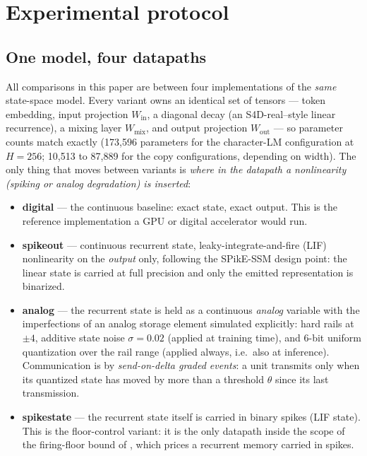 
\section{Experimental protocol}
\label{sec:protocol}

\subsection{One model, four datapaths}
\label{sec:variants}

All comparisons in this paper are between four implementations of the \emph{same} state-space
model. Every variant owns an identical set of tensors --- token embedding, input projection
$W_{\mathrm{in}}$, a diagonal decay (an S4D-real--style linear recurrence), a mixing layer
$W_{\mathrm{mix}}$, and output projection $W_{\mathrm{out}}$ --- so parameter counts match
exactly (173{,}596 parameters for the character-LM configuration at $H{=}256$; 10{,}513 to
87{,}889 for the copy configurations, depending on width). The only thing that moves between
variants is \emph{where in the datapath a nonlinearity (spiking or analog degradation) is
inserted}:

\begin{itemize}
  \item \textbf{digital} --- the continuous baseline: exact state, exact output. This is the
    reference implementation a GPU or digital accelerator would run.
  \item \textbf{spikeout} --- continuous recurrent state, leaky-integrate-and-fire (LIF)
    nonlinearity on the \emph{output} only, following the SPikE-SSM design point: the linear
    state is carried at full precision and only the emitted representation is binarized.
  \item \textbf{analog} --- the recurrent state is held as a continuous \emph{analog} variable
    with the imperfections of an analog storage element simulated explicitly: hard rails at
    $\pm 4$, additive state noise $\sigma{=}0.02$ (applied at training time), and 6-bit uniform
    quantization over the rail range (applied always, i.e.\ also at inference). Communication
    is by \emph{send-on-delta graded events}: a unit transmits only when its quantized state
    has moved by more than a threshold $\theta$ since its last transmission.
  \item \textbf{spikestate} --- the recurrent state itself is carried in binary spikes (LIF
    state). This is the floor-control variant: it is the only datapath inside the scope of the
    firing-floor bound of \citet{paper1}, which prices a recurrent memory carried in spikes.
\end{itemize}

